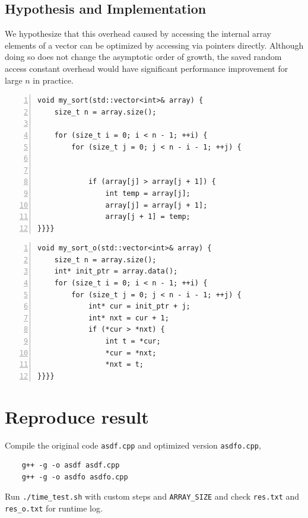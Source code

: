\documentclass[a4paper]{article}
\begin{document}
\subsection*{Hypothesis and Implementation}
We hypothesize that this overhead caused by accessing the internal array elements of a vector can be optimized by accessing via pointers directly. Although doing so does not change the asymptotic 
order of growth, the saved random access constant overhead would have significant performance improvement for large $n$ in practice.
\par\vspace{3ex}
\begin{minipage}{0.45\linewidth}
    \begin{Verbatim}[frame=topline,numbers=left,label= Original,framesep=3mm]
void my_sort(std::vector<int>& array) {
    size_t n = array.size();

    for (size_t i = 0; i < n - 1; ++i) {
        for (size_t j = 0; j < n - i - 1; ++j) {


            if (array[j] > array[j + 1]) {
                int temp = array[j];
                array[j] = array[j + 1];
                array[j + 1] = temp;
}}}}
    \end{Verbatim}
    \end{minipage}\hfill
    \begin{minipage}{0.45\linewidth}
    \begin{Verbatim}[frame=topline,numbers=left,label= Optimized,framesep=3mm]
void my_sort_o(std::vector<int>& array) {
    size_t n = array.size();
    int* init_ptr = array.data();
    for (size_t i = 0; i < n - 1; ++i) {
        for (size_t j = 0; j < n - i - 1; ++j) {
            int* cur = init_ptr + j;
            int* nxt = cur + 1;
            if (*cur > *nxt) {
                int t = *cur;
                *cur = *nxt;
                *nxt = t;
}}}}
    \end{Verbatim}
    \end{minipage}\hfill
\section{Reproduce result}
Compile the original code \texttt{asdf.cpp} and optimized version \texttt{asdfo.cpp}, 
\begin{lstlisting}
    g++ -g -o asdf asdf.cpp
    g++ -g -o asdfo asdfo.cpp
\end{lstlisting}
Run \texttt{./time\_test.sh} with custom steps and \texttt{ARRAY\_SIZE} and 
check \texttt{res.txt} and \texttt{res\_o.txt} for runtime log.
\par\vspace{-1em}
\end{document}
